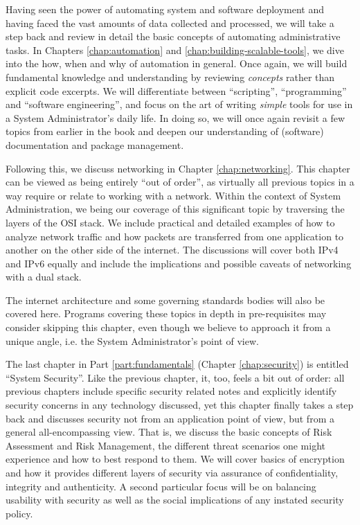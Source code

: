 Having seen the power of automating system and
software deployment and having faced the vast amounts
of data collected and processed, we will take a step
back and review in detail the basic concepts of
automating administrative tasks.  In Chapters
\ref{chap:automation} and
\ref{chap:building-scalable-tools}, we dive into the
how, when and why of automation in general.  Once
again, we will build fundamental knowledge and
understanding by reviewing {\em concepts} rather than
explicit code excerpts.  We will differentiate between
``scripting'', ``programming'' and ``software
engineering'', and focus on the art of writing {\em
simple} tools for use in a System Administrator's
daily life.  In doing so, we will once again revisit a
few topics from earlier in the book and deepen our
understanding of (software) documentation and package
management.

Following this, we discuss networking in Chapter
\ref{chap:networking}.  This chapter can be viewed as
being entirely ``out of order'', as virtually all
previous topics in a way require or relate to working
with a network.  Within the context of System
Administration, we being our coverage of this
significant topic by traversing the layers of the OSI
stack.  We include practical and detailed examples of
how to analyze network traffic and how packets are
transferred from one application to another on the
other side of the internet.  The discussions will
cover both IPv4 and IPv6 equally and include the
implications and possible caveats of networking with a
dual stack.

The internet architecture and some governing standards
bodies will also be covered here.  Programs covering
these topics in depth in pre-requisites may consider
skipping this chapter, even though we believe to
approach it from a unique angle, i.e. the System
Administrator's point of view.

The last chapter in Part \ref{part:fundamentals}
(Chapter \ref{chap:security}) is entitled ``System
Security''.  Like the previous chapter, it, too, feels
a bit out of order: all previous chapters include
specific security related notes and explicitly
identify security concerns in any technology
discussed, yet this chapter finally takes a step back
and discusses security not from an application point
of view, but from a general all-encompassing view.
That is, we discuss the basic concepts of Risk
Assessment and Risk Management, the different threat
scenarios one might experience and how to best respond
to them.  We will cover basics of encryption and how
it provides different layers of security via assurance
of confidentiality, integrity and authenticity. A
second particular focus will be on balancing usability
with security as well as the social implications of
any instated security policy.  \\

